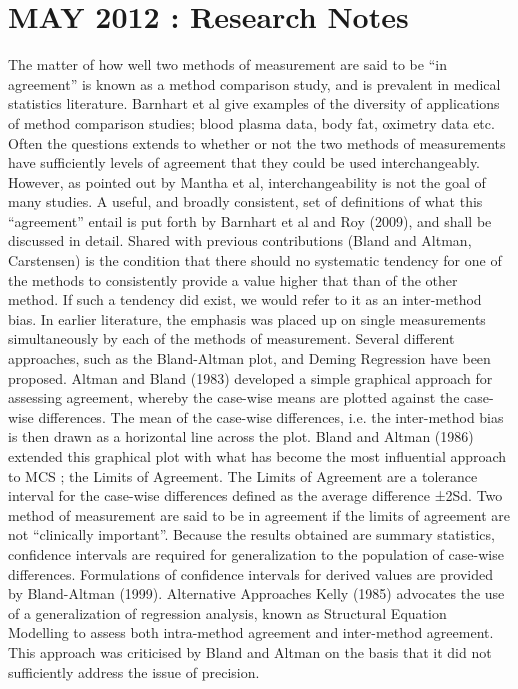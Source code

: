 \section*{MAY 2012 : Research Notes}
The matter of how well two methods of measurement are said to be “in agreement” is known as a method comparison study, and is prevalent in medical statistics literature.  Barnhart et al give examples of the diversity of applications of method comparison studies; blood plasma data, body fat, oximetry data etc. 
Often the questions extends to whether or not the two methods of measurements have sufficiently levels of agreement that they could be used interchangeably. However, as pointed out by Mantha et al, interchangeability is not the goal of many studies.
A useful, and broadly consistent, set of definitions of what this “agreement” entail is put forth by Barnhart et al and Roy (2009), and shall be discussed in detail.
Shared with previous contributions (Bland and Altman, Carstensen) is the condition that there should no systematic tendency for one of the methods to consistently provide a value higher that than of the other method. If such a tendency did exist, we would refer to it as an inter-method bias.
In earlier literature, the emphasis was placed up on single measurements simultaneously by each of the methods of measurement. Several different approaches, such as the Bland-Altman plot, and Deming Regression have been proposed. 
Altman and Bland (1983) developed a simple graphical approach for assessing agreement,  whereby the case-wise means are plotted against the case-wise differences. The mean of the case-wise differences, i.e. the inter-method bias is then drawn as a horizontal line across the plot. 
Bland and Altman (1986) extended this graphical plot with what has become the most influential approach to MCS ; the Limits of Agreement. The Limits of Agreement are a tolerance interval for the case-wise differences defined as the average difference ±2Sd. Two method of measurement are said to be in agreement if the limits of agreement are not “clinically important”.
Because the results obtained are summary statistics, confidence intervals are required for generalization to the population of case-wise differences. Formulations of confidence intervals for derived values are provided by Bland-Altman (1999).
Alternative Approaches
Kelly (1985) advocates the use of a generalization of regression analysis, known as Structural Equation Modelling to assess both intra-method agreement and inter-method agreement. This approach was criticised by Bland and Altman on the basis that it did not sufficiently address the issue of precision.
